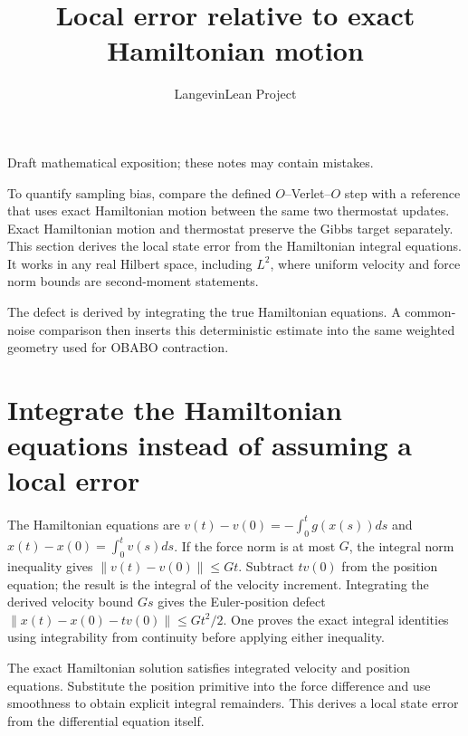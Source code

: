 \documentclass[11pt,a4paper]{article}
\title{\texorpdfstring{Local error relative to exact Hamiltonian motion}{Local error relative to exact Hamiltonian motion}}
\author{LangevinLean Project}
\date{}
\begin{document}
\maketitle
Draft mathematical exposition; these notes may contain mistakes.


To quantify sampling bias, compare the defined \(O\)–Verlet–\(O\) step with a reference that uses exact Hamiltonian motion between the same two thermostat updates. Exact Hamiltonian motion and thermostat preserve the Gibbs target separately. This section derives the local state error from the Hamiltonian integral equations. It works in any real Hilbert space, including \(L^{2}\), where uniform velocity and force norm bounds are second-moment statements.



The defect is derived by integrating the true Hamiltonian equations. A common-noise comparison then inserts this deterministic estimate into the same weighted geometry used for OBABO contraction.


\section{\texorpdfstring{Integrate the Hamiltonian equations instead of assuming a local error}{Integrate the Hamiltonian equations instead of assuming a local error}}


The Hamiltonian equations are \(v(t)-v(0)=-\int_0^t g(x(s))ds\) and \(x(t)-x(0)=\int_0^t v(s)ds\). If the force norm is at most \(G\), the integral norm inequality gives \(\|v(t)-v(0)\|\le Gt\). Subtract \(tv(0)\) from the position equation; the result is the integral of the velocity increment. Integrating the derived velocity bound \(Gs\) gives the Euler-position defect \(\|x(t)-x(0)-tv(0)\|\le Gt^2/2\). One proves the exact integral identities using integrability from continuity before applying either inequality.



The exact Hamiltonian solution satisfies integrated velocity and position equations. Substitute the position primitive into the force difference and use smoothness to obtain explicit integral remainders. This derives a local state error from the differential equation itself.
\end{document}
